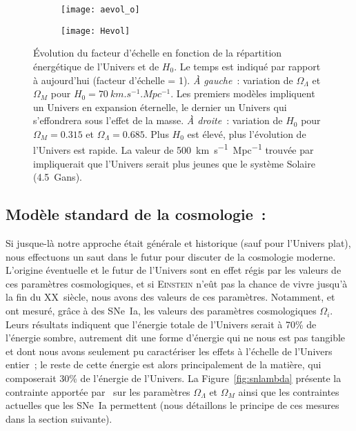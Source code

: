 \documentclass[../main/main.tex]{subfiles}
\begin{document}
\begin{figure}[ht]
    \centering
    \begin{subfigure}[c]{.48\linewidth}
        \centering
        \texttt{[image: aevol\_o]}
        \label{fig:aevol_l}
    \end{subfigure}
    \hfill
    \begin{subfigure}[c]{.48\linewidth}
        \centering
        \texttt{[image: Hevol]}
        \label{fig:aevol_l}
    \end{subfigure}
    \caption[Évolution du facteur d'échelle en fonction de la répartition
    énergétique de l'Univers et de $H_0$]{Évolution du facteur d'échelle en
        fonction de la répartition énergétique de l'Univers et de $H_0$. Le
        temps est indiqué par rapport à aujourd'hui (facteur d'échelle = 1).
        \textit{À gauche}~: variation de $\Omega_\Lambda$ et $\Omega_M$ pour
        $H_0 = \SI{70}{km.s^{-1}.Mpc^{-1}}$. Les premiers modèles impliquent un
        Univers en expansion éternelle, le dernier un Univers qui s'effondrera
        sous l'effet de la masse. \textit{À droite}~: variation de $H_0$ pour
        $\Omega_M = \num{0.315}$ et $\Omega_{\Lambda} = \num{0.685}$. Plus $H_0$
        est élevé, plus l'évolution de l'Univers est rapide. La valeur de
        \SI{500}{km.s^{-1}.Mpc^{-1}} trouvée par \cite{hubble1929} impliquerait
        que l'Univers serait plus jeunes que le système Solaire
    (\SI{4.5}{Gans}).}\label{fig:aevol}
\end{figure}

\subsection{Modèle standard de la cosmologie~: \lcdm}\label{sec:MS}

Si jusque-là notre approche était générale et historique (sauf pour l'Univers
plat), nous effectuons un saut dans le futur pour discuter de la cosmologie
moderne. L'origine éventuelle et le futur de l'Univers sont en effet régis par les
valeurs de ces paramètres cosmologiques, et si \textsc{Einstein} n'eût pas la
chance de vivre jusqu'à la fin du XX\ieme~siècle, nous avons des valeurs de ces
paramètres. Notamment, \cite{riess1998} et~\cite{perlmutter1999} ont mesuré,
grâce à des SNe~Ia, les valeurs des paramètres cosmologiques $\Omega_i$. Leurs
résultats indiquent que l'énergie totale de l'Univers serait à 70\% de l'énergie
sombre, autrement dit une forme d'énergie qui ne nous est pas tangible et dont
nous avons seulement pu caractériser les effets à l'échelle de l'Univers entier~; le
reste de cette énergie est alors principalement de la matière, qui composerait
30\% de l'énergie de l'Univers. La Figure~\ref{fig:snlambda} présente la
contrainte apportée par~\cite{riess1998} sur les paramètres $\Omega_\Lambda$ et
$\Omega_M$ ainsi que les contraintes actuelles que les SNe~Ia permettent (nous
détaillons le principe de ces mesures dans la section suivante).
\end{document}
